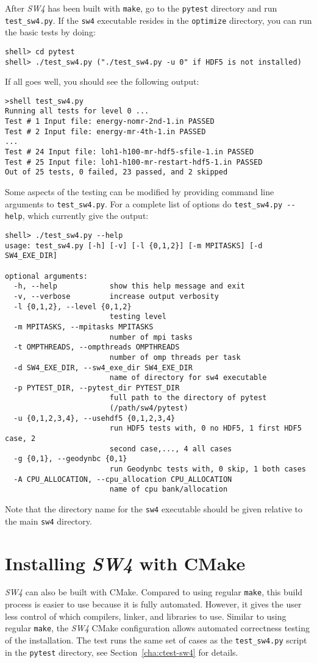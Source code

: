 \documentclass[11pt]{article}
\begin{document}
After \emph{SW4} has been built with \verb+make+, go to the \verb+pytest+ directory and run
\verb+test_sw4.py+. If the \verb+sw4+ executable resides in the \verb+optimize+ directory, you can
run the basic tests by doing:
\begin{verbatim}
shell> cd pytest
shell> ./test_sw4.py ("./test_sw4.py -u 0" if HDF5 is not installed)
\end{verbatim}
If all goes well, you should see the following output:
\begin{verbatim}
>shell test_sw4.py
Running all tests for level 0 ...
Test # 1 Input file: energy-nomr-2nd-1.in PASSED
Test # 2 Input file: energy-mr-4th-1.in PASSED
...
Test # 24 Input file: loh1-h100-mr-hdf5-sfile-1.in PASSED
Test # 25 Input file: loh1-h100-mr-restart-hdf5-1.in PASSED
Out of 25 tests, 0 failed, 23 passed, and 2 skipped
\end{verbatim}
Some aspects of the testing can be modified by providing command line arguments to
\verb+test_sw4.py+. For a complete list of options do \verb+test_sw4.py --help+, which currently
give the output:
\begin{verbatim}
shell> ./test_sw4.py --help
usage: test_sw4.py [-h] [-v] [-l {0,1,2}] [-m MPITASKS] [-d SW4_EXE_DIR]

optional arguments:
  -h, --help            show this help message and exit
  -v, --verbose         increase output verbosity
  -l {0,1,2}, --level {0,1,2}
                        testing level
  -m MPITASKS, --mpitasks MPITASKS
                        number of mpi tasks
  -t OMPTHREADS, --ompthreads OMPTHREADS
                        number of omp threads per task
  -d SW4_EXE_DIR, --sw4_exe_dir SW4_EXE_DIR
                        name of directory for sw4 executable
  -p PYTEST_DIR, --pytest_dir PYTEST_DIR
                        full path to the directory of pytest
                        (/path/sw4/pytest)
  -u {0,1,2,3,4}, --usehdf5 {0,1,2,3,4}
                        run HDF5 tests with, 0 no HDF5, 1 first HDF5 case, 2
                        second case,..., 4 all cases
  -g {0,1}, --geodynbc {0,1}
                        run Geodynbc tests with, 0 skip, 1 both cases
  -A CPU_ALLOCATION, --cpu_allocation CPU_ALLOCATION
                        name of cpu bank/allocation
\end{verbatim}
Note  that the directory name for the \verb+sw4+ executable should be given relative to the main
\verb+sw4+ directory.

\section{Installing \emph{SW4} with CMake}\label{cha:installing-cmake-sw4}
\emph{SW4} can also be built with CMake. Compared to using regular {\tt make}, this build process is
easier to use because it is fully automated. However, it gives the user less control of which
compilers, linker, and libraries to use. Similar to using regular {\tt make}, the \emph{SW4} CMake
configuration allows automated correctness testing of the installation. The test runs the same set
of cases as the \verb+test_sw4.py+ script in the \verb+pytest+ directory, see
Section~\ref{cha:ctest-sw4} for details.
\end{document}
